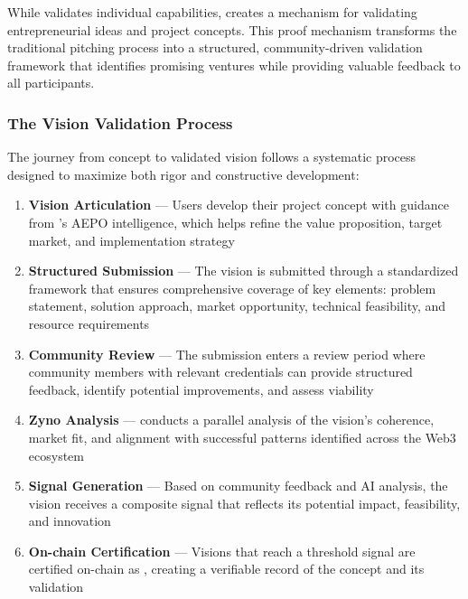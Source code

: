 While  validates individual capabilities,  creates a mechanism for validating entrepreneurial ideas and project concepts. This proof mechanism transforms the traditional pitching process into a structured, community-driven validation framework that identifies promising ventures while providing valuable feedback to all participants.

\subsubsection*{The Vision Validation Process}

The journey from concept to validated vision follows a systematic process designed to maximize both rigor and constructive development:

\begin{enumerate}
    \item \textbf{Vision Articulation} — Users develop their project concept with guidance from 's AEPO intelligence, which helps refine the value proposition, target market, and implementation strategy
    
    \item \textbf{Structured Submission} — The vision is submitted through a standardized framework that ensures comprehensive coverage of key elements: problem statement, solution approach, market opportunity, technical feasibility, and resource requirements
    
    \item \textbf{Community Review} — The submission enters a review period where community members with relevant  credentials can provide structured feedback, identify potential improvements, and assess viability
    
    \item \textbf{Zyno Analysis} —  conducts a parallel analysis of the vision's coherence, market fit, and alignment with successful patterns identified across the Web3 ecosystem
    
    \item \textbf{Signal Generation} — Based on community feedback and AI analysis, the vision receives a composite signal that reflects its potential impact, feasibility, and innovation
    
    \item \textbf{On-chain Certification} — Visions that reach a threshold signal are certified on-chain as , creating a verifiable record of the concept and its validation
\end{enumerate}

